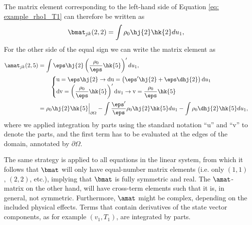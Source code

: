 The matrix element corresponding to the left-hand side of Equation \eqref{eq: example_rho1_T1} can therefore be written as
\begin{equation}
  \bmat_{jk}(2, 2) = \int \rho_0 \hj{2}\hk{2}du_1,
\end{equation}
For the other side of the equal sign we can write the matrix element as
\begin{equation} \label{eq: amat_rho1_T1}
  \begin{aligned}
    \amat_{jk}(2, 5) &=
      \int \eps \hj{2}\left(\frac{\rho_0}{\eps}\hk{5}\right)'du_1, \\
      &\qquad \begin{cases}
        \text{u} = \eps\hj{2} \rightarrow \text{du} = \left(\eps'\hj{2} + \eps\dhj{2}\right)\text{d}u_1 \\
        \text{dv} = \left(\dfrac{\rho_0}{\eps}\hk{5}\right)'\text{d}u_1
          \rightarrow \text{v} = \dfrac{\rho_0}{\eps}\hk{5}
      \end{cases} \\
      &= \rho_0 \hj{2}\hk{5}\Bigr|_{\partial \Omega}
        - \int \frac{\eps'}{\eps}\rho_0 \hj{2}\hk{5}du_1
        - \int \rho_0 \dhj{2}\hk{5}du_1,
  \end{aligned}
\end{equation}
where we applied integration by parts using the standard notation ``u'' and ``v'' to denote the parts, and the first term has to be evaluated at the edges of the domain, annotated by $\partial\Omega$.

The same strategy is applied to all equations in the linear system, from which it follows that $\bmat$ will only have equal-number matrix elements (i.e. only $(1, 1)$, $(2, 2)$, etc.), implying that $\bmat$ is fully symmetric and real. The $\amat$-matrix on the other hand, will have cross-term elements such that it is, in general, not symmetric. Furthermore, $\amat$ might be complex, depending on the included physical effects. Terms that contain derivatives of the state vector components, as for example $(v_1, T_1)$, are integrated by parts.


